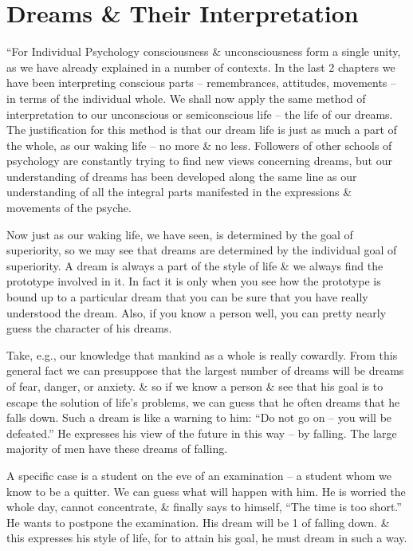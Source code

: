 \documentclass{article}
\begin{document}

\section{Dreams \& Their Interpretation}
``For Individual Psychology consciousness \& unconsciousness form a single unity, as we have already explained in a number of contexts. In the last 2 chapters we have been interpreting conscious parts -- remembrances, attitudes, movements -- in terms of the individual whole. We shall now apply the same method of interpretation to our unconscious or semiconscious life -- the life of our dreams. The justification for this method is that our dream life is just as much a part of the whole, as our waking life -- no more \& no less. Followers of other schools of psychology are constantly trying to find new views concerning dreams, but our understanding of dreams has been developed along the same line as our understanding of all the integral parts manifested in the expressions \& movements of the psyche.

Now just as our waking life, we have seen, is determined by the goal of superiority, so we may see that dreams are determined by the individual goal of superiority. A dream is always a part of the style of life \& we always find the prototype involved in it. In fact it is only when you see how the prototype is bound up to a particular dream that you can be sure that you have really understood the dream. Also, if you know a person well, you can pretty nearly guess the character of his dreams.

Take, e.g., our knowledge that mankind as a whole is really cowardly. From this general fact we can presuppose that the largest number of dreams will be dreams of fear, danger, or anxiety. \& so if we know a person \& see that his goal is to escape the solution of life's problems, we can guess that he often dreams that he falls down. Such a dream is like a warning to him: ``Do not go on -- you will be defeated.'' He expresses his view of the future in this way -- by falling. The large majority of men have these dreams of falling.

A specific case is a student on the eve of an examination -- a student whom we know to be a quitter. We can guess what will happen with him. He is worried the whole day, cannot concentrate, \& finally says to himself, ``The time is too short.'' He wants to postpone the examination. His dream will be 1 of falling down. \& this expresses his style of life, for to attain his goal, he must dream in such a way.
\end{document}
